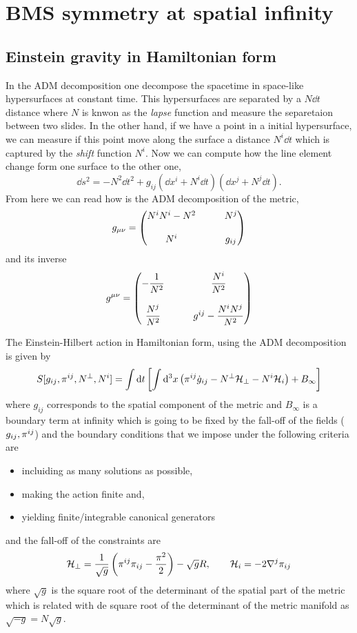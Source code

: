 \section{BMS symmetry at spatial infinity}
\subsection{Einstein gravity in Hamiltonian form}
In the ADM decomposition one decompose the spacetime in space-like hypersurfaces at constant time. This hypersurfaces are separated by a $N\dd t$ distance where $N$ is knwon as the \textit{lapse} function and measure the separetaion between two slides. In the other hand, if we have a point in a initial hypersurface,  we can measure if this point move along the surface a distance $N^{i}\dd t$ which is captured by the \textit{shift} function $N^{i}$. Now we can compute how the line element change form one surface to the other one, 
\begin{equation}
  \dd s^2=-N^2\dd t^2+g_{ij}(\dd x^{i}+N^{i}\dd t)(\dd x^{j}+N^{j}\dd t).
\end{equation}
From here we can read how is the ADM decomposition of the metric,
\begin{equation}
  g_{\m\n }=\mqty(N^{i}N^{i}-N^2&&& N^j\\\\
  N^{i}&&& g_{ij})
\end{equation}
and its inverse
\begin{equation}
  g^{\m\n }=\mqty(-\dfrac{1}{N^2}&&& \dfrac{N^{i}}{N^2}\\\\
  \dfrac{N^j}{N^2}&&& g^{ij}-\dfrac{N^{i}N^j}{N^2})
\end{equation}

The Einstein-Hilbert action in Hamiltonian form, using the ADM decomposition is given by
\begin{equation}
  S[g_{ij},\pi^{ij},N^\perp,N^{i}]=\int\dd t\left[\int\dd^3x\left(\pi^{ij}\dot{g}_{ij}-N^\perp\mathcal{H}_\perp-N^{i}\mathcal{H}_i\right)+B_\infty\right]
\end{equation}
where $g_{ij}$ corresponds to the spatial component of the metric and $B_\infty$ is a boundary term at infinity which is going to be fixed by the fall-off of the fields ($g_{ij},\pi^{ij}$) and the boundary conditions that we impose under the following criteria are
\begin{itemize}
	\item incluiding as many solutions as possible,
	\item making the action finite and,
	\item yielding finite/integrable canonical generators
\end{itemize}
and the fall-off of the constraints are
\begin{equation}
  \mathcal{H}_\perp=\frac{1}{\sqrt{g}}\left(\pi^{ij}\pi_{ij}-\frac{\pi^2}{2}\right)-\sqrt{g}R,\qquad \mathcal{H}_i=-2\nabla^j\pi_{ij}
\end{equation}
where $\sqrt{g}$ is the square root of the determinant of the spatial part of the metric which is related with de square root of the determinant of the metric manifold as $\sqrt{-g}=N\sqrt{g}$. 

